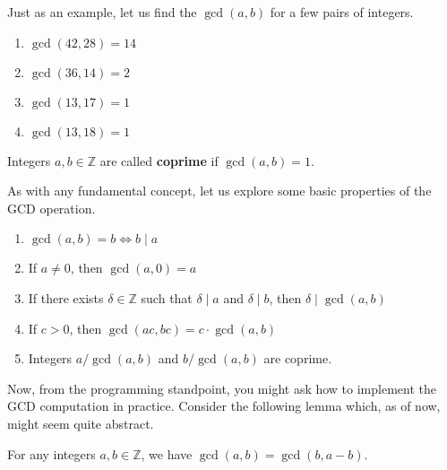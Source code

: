 \documentclass[../lecture-notes-148x210.tex]{subfiles}
\begin{document}
\begin{example}
    Just as an example, let us find the $\gcd(a, b)$ for a few pairs of integers.
    
    \begin{multicols}{2}
        \begin{enumerate}
            \item $\gcd(42, 28) = 14$
            \item $\gcd(36, 14) = 2$
            \item $\gcd(13, 17) = 1$
            \item $\gcd(13, 18) = 1$
        \end{enumerate}
    \end{multicols}
\end{example}

\begin{definition}
    Integers $a, b \in \mathbb{Z}$ are called \textbf{coprime} if $\gcd(a, b) = 1$.
\end{definition}

As with any fundamental concept, let us explore some basic properties of the GCD operation.

\begin{lemma}\label{lemma:gcd_properties}
    \hfil
    \begin{enumerate}
        \item $\gcd(a, b) = b \iff b \mid a$
        \item If $a \neq 0$, then $\gcd(a, 0) = a$
        \item If there exists $\delta \in \mathbb{Z}$ such that $\delta \mid a$ and $\delta \mid b$, then $\delta \mid \gcd(a, b)$
        \item If $c > 0$, then $\gcd(ac, bc) = c \cdot \gcd(a, b)$
        \item Integers $a/\gcd(a,b)$ and $b/\gcd(a,b)$ are coprime.
    \end{enumerate}
\end{lemma}

Now, from the programming standpoint, you might ask how to implement the GCD 
computation in practice. Consider the following lemma which, as of now, might 
seem quite abstract.

\begin{lemma} \label{lemma:gcd_basic_calculation}
    For any integers $a,b \in \mathbb{Z}$, we have $\gcd(a, b) = \gcd(b, a - b)$. 
\end{lemma}
\end{document}
